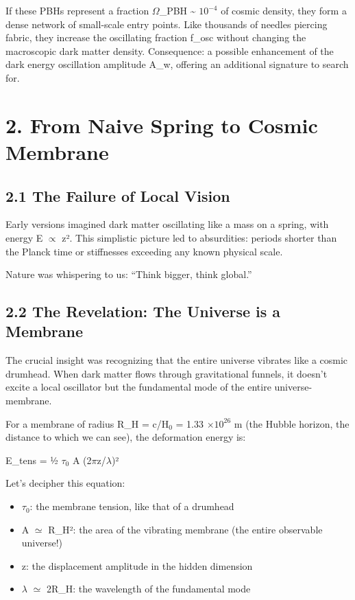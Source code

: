 \documentclass[
  11pt,
]{report}
\providecommand{\tightlist}{%
  \setlength{\itemsep}{0pt}\setlength{\parskip}{0pt}}
\begin{document}
If these PBHs represent a fraction \(\Omega\)\_PBH \textasciitilde{}
\(10^{-4}\) of cosmic density, they form a dense network of small-scale
entry points. Like thousands of needles piercing fabric, they increase
the oscillating fraction f\_osc without changing the macroscopic dark
matter density. Consequence: a possible enhancement of the dark energy
oscillation amplitude A\_w, offering an additional signature to search
for.

\section{2. From Naive Spring to Cosmic
Membrane}\label{from-naive-spring-to-cosmic-membrane}

\subsection{2.1 The Failure of Local
Vision}\label{the-failure-of-local-vision}

Early versions imagined dark matter oscillating like a mass on a spring,
with energy E \(\propto\) z². This simplistic picture led to
absurdities: periods shorter than the Planck time or stiffnesses
exceeding any known physical scale.

Nature was whispering to us: ``Think bigger, think global.''

\subsection{2.2 The Revelation: The Universe is a
Membrane}\label{the-revelation-the-universe-is-a-membrane}

The crucial insight was recognizing that the entire universe vibrates
like a cosmic drumhead. When dark matter flows through gravitational
funnels, it doesn't excite a local oscillator but the fundamental mode
of the entire universe-membrane.

For a membrane of radius R\_H = c/H\(_0\) = 1.33 \(\times 10^{26}\) m
(the Hubble horizon, the distance to which we can see), the deformation
energy is:

E\_tens = ½ \(\tau_0\) A (2\(\pi\)z/\(\lambda\))²

Let's decipher this equation:

\begin{itemize}
\tightlist
\item
  \(\tau_0\): the membrane tension, like that of a drumhead
\item
  A \(\simeq\) R\_H²: the area of the vibrating membrane (the entire
  observable universe!)
\item
  z: the displacement amplitude in the hidden dimension
\item
  \(\lambda\) \(\simeq\) 2R\_H: the wavelength of the fundamental mode
\end{itemize}
\end{document}
